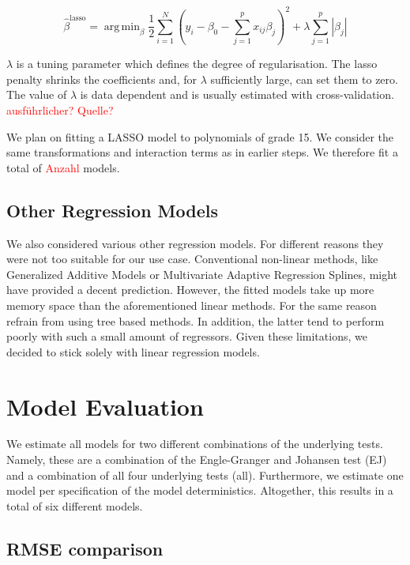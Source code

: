 \documentclass[12pt,a4paper]{article}
\DeclareMathOperator*{\argmin}{arg\,min}
\begin{document}
\begin{equation}
    \hat{\beta}^{\text{lasso}} = \argmin_{\beta} \frac{1}{2} \sum^N_{i=1} \left( y_i - \beta_0 - \sum^p_{j=1} x_{ij} \beta_j \right)^2 + 
    \lambda \sum^p_{j=1} |\beta_j |
\label{eq:9}
\end{equation}

\(\lambda\) is a tuning parameter which defines the degree of
regularisation. The lasso penalty shrinks the coefficients and, for
\(\lambda\) sufficiently large, can set them to zero. The value of
\(\lambda\) is data dependent and is usually estimated with
cross-validation. \textcolor{red}{ausführlicher? Quelle?}

We plan on fitting a LASSO model to polynomials of grade 15. We consider
the same transformations and interaction terms as in earlier steps. We
therefore fit a total of \textcolor{red}{Anzahl} models.

\hypertarget{other-regression-models}{%
\subsection{Other Regression Models}\label{other-regression-models}}

We also considered various other regression models. For different
reasons they were not too suitable for our use case. Conventional
non-linear methods, like Generalized Additive Models or Multivariate
Adaptive Regression Splines, might have provided a decent prediction.
However, the fitted models take up more memory space than the
aforementioned linear methods. For the same reason refrain from using
tree based methods. In addition, the latter tend to perform poorly with
such a small amount of regressors. Given these limitations, we decided
to stick solely with linear regression models.

\hypertarget{model-evaluation}{%
\section{Model Evaluation}\label{model-evaluation}}

We estimate all models for two different combinations of the underlying
tests. Namely, these are a combination of the Engle-Granger and Johansen
test (EJ) and a combination of all four underlying tests (all).
Furthermore, we estimate one model per specification of the model
deterministics. Altogether, this results in a total of six different
models.

\hypertarget{rmse-comparison}{%
\subsection{RMSE comparison}\label{rmse-comparison}}
\end{document}
